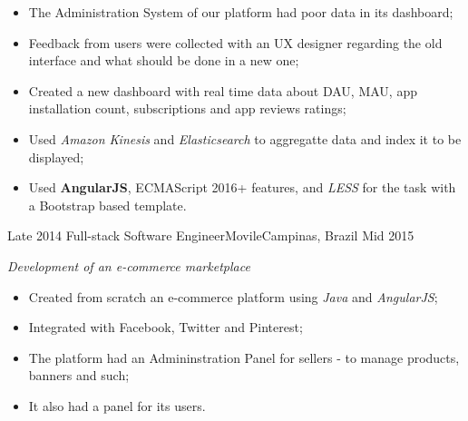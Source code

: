 \begin{experiences}
{          \begin{itemize}
            \item The Administration System of our platform had poor data in its dashboard;
            \item Feedback from users were collected with an UX designer regarding the old interface and what should be done in a new one;
            \item Created a new dashboard with real time data about DAU, MAU, app installation count, subscriptions and app reviews ratings;
            \item Used \emph{Amazon Kinesis} and \emph{Elasticsearch} to aggregatte data and index it to be displayed;
            \item Used \textbf{AngularJS}, ECMAScript 2016+ features, and \emph{LESS} for the task with a Bootstrap based template.\\
          \end{itemize}
        }{}
  \experience
  {Late 2014} {Full-stack Software Engineer}{Movile}{Campinas, Brazil}
  {Mid 2015}
        {
        \emph{Development of an e-commerce marketplace}\\
          \begin{itemize}
            \item Created from scratch an e-commerce platform using \emph{Java} and \emph{AngularJS};
            \item Integrated with Facebook, Twitter and Pinterest;
            \item The platform had an Admininstration Panel for sellers - to manage products, banners and such; 
            \item It also had a panel for its users.\\ 
          \end{itemize}
        }{}
\end{experiences}